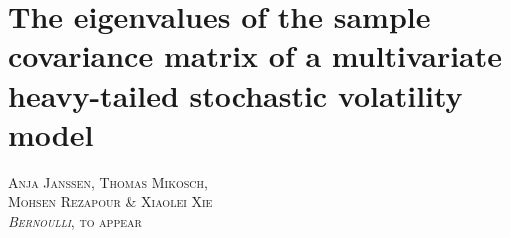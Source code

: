 \chapter[Eigenvalues of the sample covariance matrix of a   
stochastic volatility model]{{\huge The eigenvalues of the sample covariance matrix of a multivariate heavy-tailed stochastic volatility model}}\label{ch:bernoulli}

\begin{center}
\textsc{Anja Jan\ss en, Thomas Mikosch, \\Mohsen Rezapour \& Xiaolei Xie\\
{\em Bernoulli}, to appear}
\end{center}


